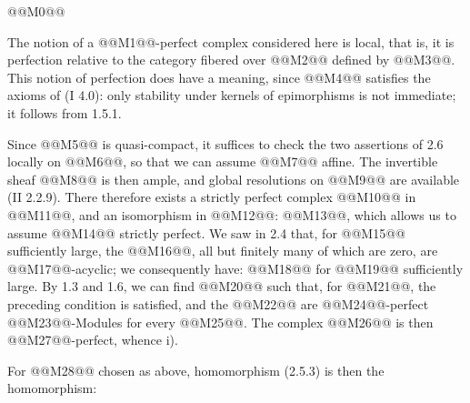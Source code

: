 @@M0@@

The notion of a @@M1@@-perfect complex considered here is local, that is, it is perfection relative to the category fibered over @@M2@@ defined by @@M3@@. This notion of perfection does have a meaning, since @@M4@@ satisfies the axioms of (I 4.0): only stability under kernels of epimorphisms is not immediate; it follows from 1.5.1.

Since @@M5@@ is quasi-compact, it suffices to check the two assertions of 2.6 locally on @@M6@@, so that we can assume @@M7@@ affine. The invertible sheaf @@M8@@ is then ample, and global resolutions on @@M9@@ are available (II 2.2.9). There therefore exists a strictly perfect complex @@M10@@ in @@M11@@, and an isomorphism in @@M12@@: @@M13@@, which allows us to assume @@M14@@ strictly perfect. We saw in 2.4 that, for @@M15@@ sufficiently large, the @@M16@@, all but finitely many of which are zero, are @@M17@@-acyclic; we consequently have:
@@M18@@
for @@M19@@ sufficiently large. By 1.3 and 1.6, we can find @@M20@@ such that, for @@M21@@, the preceding condition is satisfied, and the @@M22@@ are @@M24@@-perfect @@M23@@-Modules for every @@M25@@. The complex @@M26@@ is then @@M27@@-perfect, whence i).

For @@M28@@ chosen as above, homomorphism (2.5.3) is then the homomorphism:
